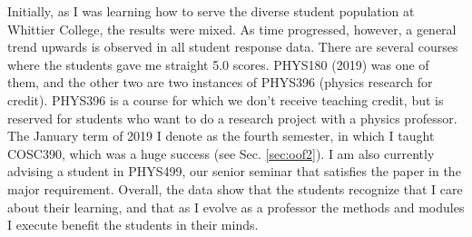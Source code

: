 \documentclass[../../main.tex]{subfiles}
\begin{document}
Initially, as I was learning how to serve the diverse student population at Whittier College, the results were mixed.  As time progressed, however, a general trend upwards is observed in all student response data.  There are several courses where the students gave me straight 5.0 scores.  PHYS180 (2019) was one of them, and the other two are two instances of PHYS396 (physics research for credit).  PHYS396 is a course for which we don't receive teaching credit, but is reserved for students who want to do a research project with a physics professor.  The January term of 2019 I denote as the fourth semester, in which I taught COSC390, which was a huge success (see Sec. \ref{sec:oof2}).  I am also currently advising a student in PHYS499, our senior seminar that satisfies the paper in the major requirement.  Overall, the data show that the students recognize that I care about their learning, and that as I evolve as a professor the methods and modules I execute benefit the students in their minds.  \\ \hspace{0.1cm}
\end{document}
